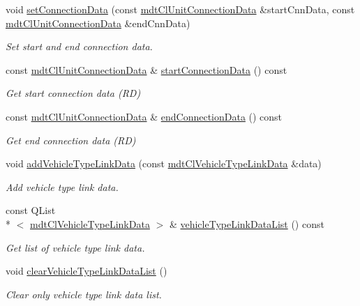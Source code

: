 \begin{DoxyCompactItemize}
void \hyperlink{classmdt_cl_link_data_af973898eb4ffe8c97f3267c99e97721b}{set\-Connection\-Data} (const \hyperlink{classmdt_cl_unit_connection_data}{mdt\-Cl\-Unit\-Connection\-Data} \&start\-Cnn\-Data, const \hyperlink{classmdt_cl_unit_connection_data}{mdt\-Cl\-Unit\-Connection\-Data} \&end\-Cnn\-Data)
\begin{DoxyCompactList}\small\item\em Set start and end connection data. \end{DoxyCompactList}\item 
const \hyperlink{classmdt_cl_unit_connection_data}{mdt\-Cl\-Unit\-Connection\-Data} \& \hyperlink{classmdt_cl_link_data_a571eacbdeb58564b340a1adce8b5541f}{start\-Connection\-Data} () const 
\begin{DoxyCompactList}\small\item\em Get start connection data (R\-D) \end{DoxyCompactList}\item 
const \hyperlink{classmdt_cl_unit_connection_data}{mdt\-Cl\-Unit\-Connection\-Data} \& \hyperlink{classmdt_cl_link_data_ae61b648f3a8b1461e06815b8ca6017f4}{end\-Connection\-Data} () const 
\begin{DoxyCompactList}\small\item\em Get end connection data (R\-D) \end{DoxyCompactList}\item 
void \hyperlink{classmdt_cl_link_data_a1346ac135fa261c7aeda0c6af073dd37}{add\-Vehicle\-Type\-Link\-Data} (const \hyperlink{classmdt_cl_vehicle_type_link_data}{mdt\-Cl\-Vehicle\-Type\-Link\-Data} \&data)
\begin{DoxyCompactList}\small\item\em Add vehicle type link data. \end{DoxyCompactList}\item 
const Q\-List\\*
$<$ \hyperlink{classmdt_cl_vehicle_type_link_data}{mdt\-Cl\-Vehicle\-Type\-Link\-Data} $>$ \& \hyperlink{classmdt_cl_link_data_a95fb259075bacba89d4519ac7678b70e}{vehicle\-Type\-Link\-Data\-List} () const 
\begin{DoxyCompactList}\small\item\em Get list of vehicle type link data. \end{DoxyCompactList}\item 
void \hyperlink{classmdt_cl_link_data_a04872523d8d231ddc38da34fd488ad26}{clear\-Vehicle\-Type\-Link\-Data\-List} ()
\begin{DoxyCompactList}\small\item\em Clear only vehicle type link data list. \end{DoxyCompactList}\end{DoxyCompactItemize}
